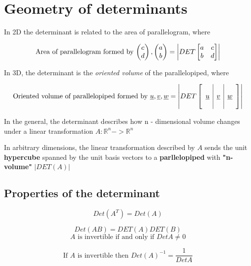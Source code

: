 \section{Geometry of determinants}

In 2D the determinant is related to the area of parallelogram, where
\begin{framed}
    \[
     \text{Area of parallelogram formed by $ \begin{pmatrix} c \\ d \end{pmatrix}, \begin{pmatrix} a \\b \end{pmatrix} $} = \left| DET \begin{bmatrix} 
     a & c \\ b & d  
     \end{bmatrix}
      \right| 
   \] 
\end{framed}

In 3D, the determinant is the \emph{oriented volume} of the parallelopiped, where
\begin{framed}
    \[
       \text{Oriented volume of parallelopiped formed by $ \underline{u}, \underline{v}, \underline{w} $} = 
       \left|  DET 
        \left[
             \begin{array} {c|c|c}
              & & \\
          \underline{u}& \underline{v}& \underline{w}\\
        & & \\
              \end{array}
        \right]
      \right| 
   \] 
\end{framed}

In the general, the determinant describes how n - dimensional volume changes under a linear transformation $A : \mathbb{R}^n -> \mathbb{R}^n$
\begin{framed}
   In arbitrary dimensions, the linear transformation described by $A$ sends the unit \textbf{hypercube} spanned by the unit basis vectors to a \textbf{parllelopiped} with \textbf{"n-volume"} $ \left| DET (A) \right| $
\end{framed}

\subsection{Properties of the determinant}
\begin{framed}
   \[
     Det (A^T) = Det(A)
   \] 

   \[
     Det (AB) = DET (A) DET(B) 
   \] 
   \[
      \text{$A$ is invertible if and only if $Det A \neq 0$}
   \] 

   \[
      \text{If $A$ is invertible then } Det (A)^{-1} = \frac{1}{Det A}
   \] 
\end{framed}




  


